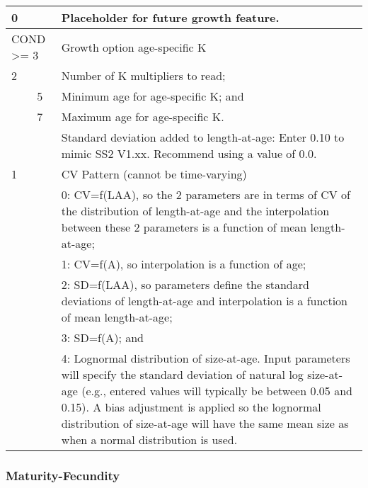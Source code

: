 \begin{longtable}{p{0.5cm} p{2cm} p{12cm}}
	0   & & Placeholder for future growth feature. \Tstrut\Bstrut\\
	\hline

	\multicolumn{2}{l}{COND >= 3} & Growth option age-specific K \Tstrut\\
	2 & & Number of K multipliers to read;\\
	& 5 & Minimum age for age-specific K; and\\
	& 7 & Maximum age for age-specific K.\Bstrut\\
	\hline

	\Tstrut 0 & & Standard deviation added to length-at-age: Enter 0.10 to mimic SS2 V1.xx. Recommend using a value of 0.0.\Bstrut\\
	\hline

	1 & & CV Pattern (cannot be time-varying) \Tstrut\\
	  & & 0: CV=f(LAA), so the 2 parameters are in terms of CV of the distribution of length-at-age and the interpolation between these 2 parameters is a function of mean length-at-age;\\
	  & & 1: CV=f(A), so interpolation is a function of age;\\
	  & & 2: SD=f(LAA), so parameters define the standard deviations of length-at-age and interpolation is a function of mean length-at-age;\\
	  & & 3: SD=f(A); and \\
	  & & 4: Lognormal distribution of size-at-age.  Input parameters will specify the standard deviation of natural log size-at-age (e.g., entered values will typically be between 0.05 and 0.15). A bias adjustment is applied so the lognormal distribution of size-at-age will have the same mean size as when a normal distribution is used.\Bstrut\\
	\hline
\end{longtable}


\subsubsection{Maturity-Fecundity}

